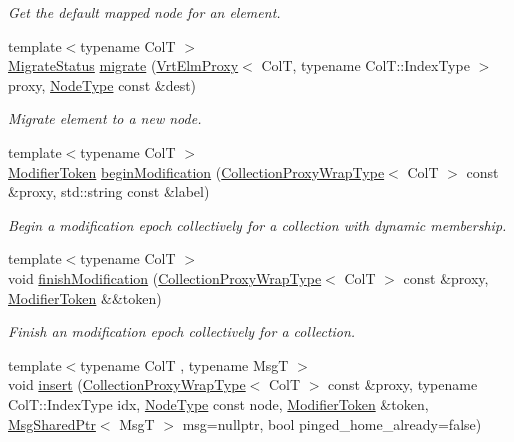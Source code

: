 \begin{DoxyCompactItemize}
\begin{DoxyCompactList}\small\item\em Get the default mapped node for an element. \end{DoxyCompactList}\item 
{\footnotesize template$<$typename ColT $>$ }\\\hyperlink{namespacevt_1_1vrt_1_1collection_ad221ad8aea9e586689b4335f5bcd9804}{Migrate\+Status} \hyperlink{structvt_1_1vrt_1_1collection_1_1_collection_manager_aa78b0230c093abfbfc42629f36047c52}{migrate} (\hyperlink{structvt_1_1vrt_1_1collection_1_1_vrt_elm_proxy}{Vrt\+Elm\+Proxy}$<$ ColT, typename Col\+T\+::\+Index\+Type $>$ proxy, \hyperlink{namespacevt_a866da9d0efc19c0a1ce79e9e492f47e2}{Node\+Type} const \&dest)
\begin{DoxyCompactList}\small\item\em Migrate element to a new node. \end{DoxyCompactList}\item 
{\footnotesize template$<$typename ColT $>$ }\\\hyperlink{structvt_1_1vrt_1_1collection_1_1_modifier_token}{Modifier\+Token} \hyperlink{structvt_1_1vrt_1_1collection_1_1_collection_manager_ac390149ecceb5a5b183086e509c3bfaa}{begin\+Modification} (\hyperlink{structvt_1_1vrt_1_1collection_1_1_collection_manager_a56458ed7f9bb22b631b9b3a745f42f94}{Collection\+Proxy\+Wrap\+Type}$<$ ColT $>$ const \&proxy, std\+::string const \&label)
\begin{DoxyCompactList}\small\item\em Begin a modification epoch collectively for a collection with dynamic membership. \end{DoxyCompactList}\item 
{\footnotesize template$<$typename ColT $>$ }\\void \hyperlink{structvt_1_1vrt_1_1collection_1_1_collection_manager_a249d475d576758006ba112af9907d271}{finish\+Modification} (\hyperlink{structvt_1_1vrt_1_1collection_1_1_collection_manager_a56458ed7f9bb22b631b9b3a745f42f94}{Collection\+Proxy\+Wrap\+Type}$<$ ColT $>$ const \&proxy, \hyperlink{structvt_1_1vrt_1_1collection_1_1_modifier_token}{Modifier\+Token} \&\&token)
\begin{DoxyCompactList}\small\item\em Finish an modification epoch collectively for a collection. \end{DoxyCompactList}\item 
{\footnotesize template$<$typename ColT , typename MsgT $>$ }\\void \hyperlink{structvt_1_1vrt_1_1collection_1_1_collection_manager_a57a03bda72fb30e3fc886111ff032819}{insert} (\hyperlink{structvt_1_1vrt_1_1collection_1_1_collection_manager_a56458ed7f9bb22b631b9b3a745f42f94}{Collection\+Proxy\+Wrap\+Type}$<$ ColT $>$ const \&proxy, typename Col\+T\+::\+Index\+Type idx, \hyperlink{namespacevt_a866da9d0efc19c0a1ce79e9e492f47e2}{Node\+Type} const node, \hyperlink{structvt_1_1vrt_1_1collection_1_1_modifier_token}{Modifier\+Token} \&token, \hyperlink{namespacevt_ab2b3d506ec8e8d1540aede826d84a239}{Msg\+Shared\+Ptr}$<$ MsgT $>$ msg=nullptr, bool pinged\+\_\+home\+\_\+already=false)

\end{DoxyCompactItemize}
